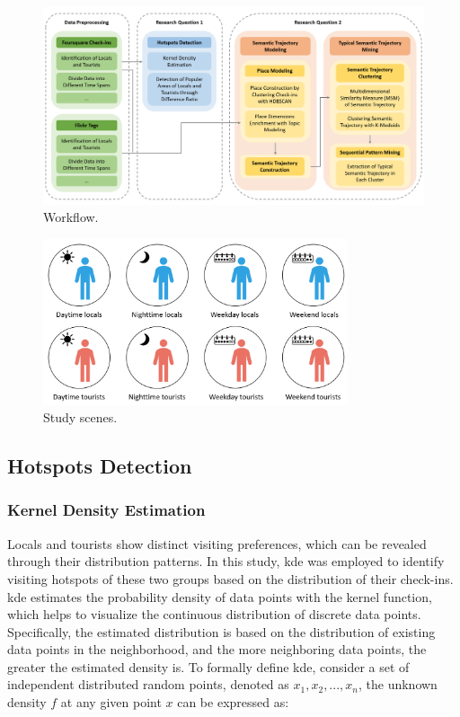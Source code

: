 \documentclass{article}
\theoremstyle{remark}
\begin{document}
\begin{figure}[h!]
\centering
\includegraphics[width=1\textwidth]{figures/workflow.png}
\caption{\label{fig:workflow}Workflow.}
\end{figure}


\begin{figure}[h!]
\centering
\includegraphics[width=0.8\textwidth]{figures/scene.png}
\caption{\label{fig:scene}Study scenes.}
\end{figure}

\subsection{Hotspots Detection}\label{hotspots_detection}

\subsubsection{Kernel Density Estimation}
Locals and tourists show distinct visiting preferences, which can be revealed through their distribution patterns. In this study, \acrfull{kde} was employed to identify visiting hotspots of these two groups based on the distribution of their check-ins. \acrshort{kde} estimates the probability density of data points with the kernel function, which helps to visualize the continuous distribution of discrete data points. Specifically, the estimated distribution is based on the distribution of existing data points in the neighborhood, and the more neighboring data points, the greater the estimated density is. To formally define \acrshort{kde}, consider a set of independent distributed random points, denoted as $x_{1}, x_{2}, ..., x_{n}$, the unknown density $f$ at any given point $x$ can be expressed as:
\end{document}
